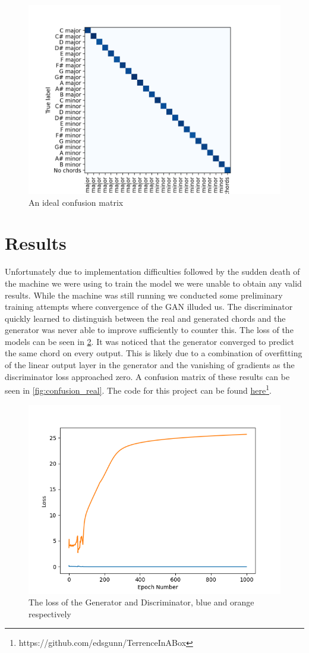 \begin{figure}
    \centering
    \includegraphics[width=0.4\columnwidth]{Figures/confusion_ideal}
    \decoRule
    \caption{An ideal confusion matrix}
    \label{fig:confusion_ideal}
\end{figure}

\section{Results}
Unfortunately due to implementation difficulties followed by the sudden death of the machine we were using to train the model we were unable to obtain any valid results.
While the machine was still running we conducted some preliminary training attempts where convergence of the GAN illuded us.
The discriminator quickly learned to distinguish between the real and generated chords and the generator was never able to improve sufficiently to counter this.
The loss of the models can be seen in \cref{fig:ModelLoss}.
It was noticed that the generator converged to predict the same chord on every output. 
This is likely due to a combination of overfitting of the linear output layer in the generator and the vanishing of gradients as the discriminator loss approached zero.
A confusion matrix of these results can be seen in \cref{fig:confusion_real}. The code for this project can be found \href{https://github.com/edsgunn/TerrenceInABox}{here}\footnote{https://github.com/edsgunn/TerrenceInABox}.
\begin{figure}
    \centering
    \includegraphics[width=0.4\columnwidth]{Figures/ModelLoss}
    \decoRule
    \caption{The loss of the Generator and Discriminator, blue and orange respectively}
    \label{fig:ModelLoss}
\end{figure}

